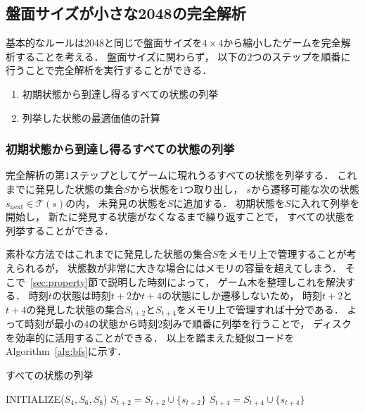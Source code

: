 \subsection{盤面サイズが小さな2048の完全解析}
\label{sec:mini2048}
基本的なルールは2048と同じで盤面サイズを$4\times4$から縮小したゲームを完全解析することを考える．
盤面サイズに関わらず， 以下の$2$つのステップを順番に行うことで完全解析を実行することができる．
\begin{enumerate}
    \item 初期状態から到達し得るすべての状態の列挙
    \item 列挙した状態の最適価値の計算
\end{enumerate}

\subsubsection{初期状態から到達し得るすべての状態の列挙}
\label{subsec:enumeration}
完全解析の第1ステップとしてゲームに現れうるすべての状態を列挙する．
これまでに発見した状態の集合$S$から状態を$1$つ取り出し， $s$から遷移可能な次の状態$s_{\text{next}} \in \mathcal{T}(s)$の内， 未発見の状態を$S$に追加する．
初期状態を$S$に入れて列挙を開始し， 新たに発見する状態がなくなるまで繰り返すことで， すべての状態を列挙することができる．

素朴な方法ではこれまでに発見した状態の集合$S$をメモリ上で管理することが考えられるが， 状態数が非常に大きな場合にはメモリの容量を超えてしまう．
そこで~\ref{sec:property}節で説明した時刻によって， ゲーム木を整理しこれを解決する．
時刻$t$の状態は時刻$t+2$か$t+4$の状態にしか遷移しないため， 時刻$t+2$と$t+4$の発見した状態の集合$S_{t+2}$と$S_{t+4}$をメモリ上で管理すれば十分である．
よって時刻が最小の$4$の状態から時刻$2$刻みで順番に列挙を行うことで， ディスクを効率的に活用することができる．
以上を踏まえた疑似コードをAlgorithm~\ref{alg:bfs}に示す．

\begin{algorithm}[tb]
\caption{すべての状態の列挙}
\label{alg:bfs}
\begin{algorithmic}[1]
    \State INITIALIZE($S_4, S_6, S_8$)
                    \State $S_{t+2} = S_{t+2} \cup \{s_{t+2}\}$
                \EndIf
            \EndFor
                    \State $S_{t+4} = S_{t+4} \cup \{s_{t+4}\}$
                \EndIf
            \EndFor
        \EndFor
    \EndFor
\EndFunction
\end{algorithmic}
\end{algorithm}

